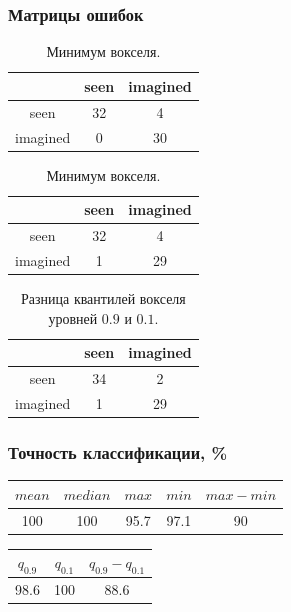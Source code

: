 \documentclass{beamer}
\begin{document}
	\begin{frame} 
		\frametitle{Матрицы ошибок}
		\vspace{0.5cm}	

		\begin{table}
			\begin{minipage}{.5\linewidth}				
				\begin{tabular}{c|cc}
					& \multicolumn{1}{c|}{seen} & imagined \\ \hline
					seen     & 32                        & 4        \\ \cline{1-1}
					imagined & 0                         & 30      
				\end{tabular}
				\caption{Среднее вокселя.}
			\end{minipage}%
			\begin{minipage}{.5\linewidth}				
				\begin{tabular}{c|cc}
					& \multicolumn{1}{c|}{seen} & imagined \\ \hline
					seen     & 32                        & 4        \\ \cline{1-1}
					imagined & 1                         & 29      
				\end{tabular}
				\caption{Минимум вокселя.}
			\end{minipage} 
		\end{table}
	
		\begin{table}[]
			\begin{tabular}{c|cc}
				& \multicolumn{1}{c|}{seen} & imagined \\ \hline
				seen     & 34                        & 2        \\ \cline{1-1}
				imagined & 1                         & 29      
			\end{tabular}
			\caption{Разница квантилей вокселя уровней $0.9$ и $0.1$.}
		\end{table}
	\end{frame}

	\begin{frame} 
		\frametitle{Точность классификации, \%}
		\vspace{1cm}
		
		\begin{table}
			\begin{tabular}{ccccc}
				$mean$ & $median$ & $max$ & $min$ & $max - min$ \\ \hline
				100 & 100 & 95.7 & 97.1 & 90
			\end{tabular}
		\end{table}
	
		\begin{table}
			\begin{tabular}{ccc}
				$q_{0.9}$ & $q_{0.1}$ & $q_{0.9} - q_{0.1}$ \\ \hline
				98.6 & 100 & 88.6
			\end{tabular}
		\end{table}				
	\end{frame}
		
		
\end{document}
